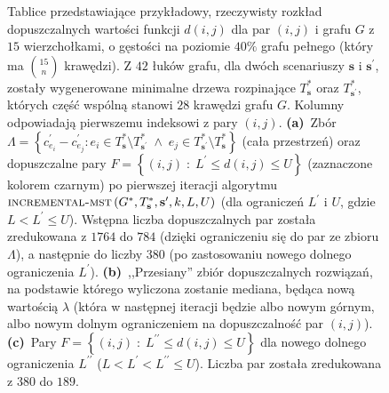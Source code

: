 \begin{figure}[!h]
\begin{subfigure}[b]{0.3\textwidth}
{\begin{tabu}{|c|c|c|c|c|c|c|c|c|c|c|c|c|c|c|c|c|c|c|c|c|c|c|c|c|c|c|c|}
			\end{tabu}%
		}
		\caption{}
		\label{fig:imstSeed:c}
	\end{subfigure}
	\hfill\null
	\caption{
		Tablice przedstawiające przykładowy, rzeczywisty rozkład dopuszczalnych wartości funkcji $d \left( i, j \right)$ dla par $\left( i, j \right)$ i grafu $G$ z $15$ wierzchołkami, o gęstości na poziomie $40\%$ grafu pełnego (który ma $\binom{15}{n}$ krawędzi). Z $42$ łuków grafu, dla dwóch scenariuszy $\textbf{s}$ i $\textbf{s}^{\prime}$, zostały wygenerowane minimalne drzewa rozpinające $T^{\ast}_{\textbf{s}}$ oraz $T^{\ast}_{\textbf{s}^{\prime}}$, których część wspólną stanowi $28$ krawędzi grafu $G$. Kolumny odpowiadają pierwszemu indeksowi z pary $\left( i, j \right)$.
		\textbf{(a)}~Zbór $\Lambda = \left\{ c^{\prime}_{e_{i}} - c^{\prime}_{e_{j}} : e_{i} \in T^{\ast}_{\textbf{s}} \setminus T^{\ast}_{\textbf{s}^{\prime}} \; \wedge \; e_{j} \in T^{\ast}_{\textbf{s}^{\prime}} \setminus T^{\ast}_{\textbf{s}} \right\}$ (cała przestrzeń) oraz dopuszczalne pary $F = \left\{ \left( i, j \right) \; : \; L^{\prime} \leqslant d \left( i, j \right) \leqslant U \right\}$ (zaznaczone kolorem czarnym) po pierwszej iteracji algorytmu $\textsc{incremental-mst} \left( G^{\ast}, T^{\ast}_{\textbf{s}}, \textbf{s}^{\prime}, k, L, U \right)$ (dla ograniczeń $L^{\prime}$ i $U$, gdzie $L < L^{\prime} \leqslant U$). Wstępna liczba dopuszczalnych par została zredukowana z $1764$ do $784$ (dzięki ograniczeniu się do par ze zbioru $\Lambda$), a następnie do liczby $380$ (po zastosowaniu nowego dolnego ograniczenia $L^{\prime}$).
		\textbf{(b)}~,,Przesiany'' zbiór dopuszczalnych rozwiązań, na podstawie którego wyliczona zostanie mediana, będąca nową wartością $\lambda$ (która w następnej iteracji będzie albo nowym górnym, albo nowym dolnym ograniczeniem na dopuszczalność par $\left( i, j \right)$).
		\textbf{(c)}~Pary $F = \left\{ \left( i, j \right) \; : \; L^{\prime\prime} \leqslant d \left( i, j \right) \leqslant U \right\}$ dla nowego dolnego ograniczenia $L^{\prime\prime}$ ($L < L^{\prime} < L^{\prime\prime} \leqslant U$). Liczba par została zredukowana z $380$ do $189$.
	}
	\label{fig:imstSeed}
\end{figure}

